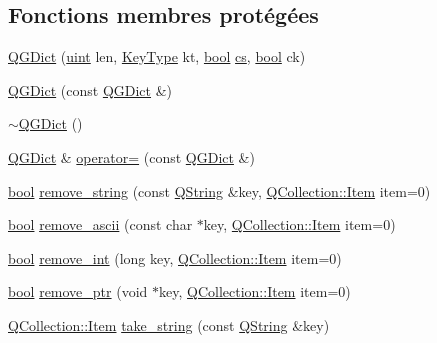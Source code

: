 \subsection*{Fonctions membres protégées}
\begin{DoxyCompactItemize}
\item 
\hyperlink{class_q_g_dict_a9dd35b06699b4527dd7e66d1b962b475}{Q\+G\+Dict} (\hyperlink{qglobal_8h_a4d3943ddea65db7163a58e6c7e8df95a}{uint} len, \hyperlink{class_q_g_dict_a4eced3c3c4e5c52360bc2f1bab85412e}{Key\+Type} kt, \hyperlink{qglobal_8h_a1062901a7428fdd9c7f180f5e01ea056}{bool} \hyperlink{qtextcodec_8cpp_a067a00d3965ca879847daf3c8c224ee6}{cs}, \hyperlink{qglobal_8h_a1062901a7428fdd9c7f180f5e01ea056}{bool} ck)
\item 
\hyperlink{class_q_g_dict_a137d355f22abdcbda8ded8b8736ec117}{Q\+G\+Dict} (const \hyperlink{class_q_g_dict}{Q\+G\+Dict} \&)
\item 
\hyperlink{class_q_g_dict_a51b6a3f2e12ac41c0a29ce248bb1ac96}{$\sim$\+Q\+G\+Dict} ()
\item 
\hyperlink{class_q_g_dict}{Q\+G\+Dict} \& \hyperlink{class_q_g_dict_a8c4e70b0dee22ada9bf8a41e3c92280d}{operator=} (const \hyperlink{class_q_g_dict}{Q\+G\+Dict} \&)
\item 
\hyperlink{qglobal_8h_a1062901a7428fdd9c7f180f5e01ea056}{bool} \hyperlink{class_q_g_dict_a50cd12c84c03da6cd92d413908d1a001}{remove\+\_\+string} (const \hyperlink{class_q_string}{Q\+String} \&key, \hyperlink{class_q_collection_ac6f3ddbf999e31fb797927f71ae6b5d7}{Q\+Collection\+::\+Item} item=0)
\item 
\hyperlink{qglobal_8h_a1062901a7428fdd9c7f180f5e01ea056}{bool} \hyperlink{class_q_g_dict_a65224d18f945fa28a1300526fd4b5903}{remove\+\_\+ascii} (const char $\ast$key, \hyperlink{class_q_collection_ac6f3ddbf999e31fb797927f71ae6b5d7}{Q\+Collection\+::\+Item} item=0)
\item 
\hyperlink{qglobal_8h_a1062901a7428fdd9c7f180f5e01ea056}{bool} \hyperlink{class_q_g_dict_a32023e3d50d6f8b81935655b66f0bdc4}{remove\+\_\+int} (long key, \hyperlink{class_q_collection_ac6f3ddbf999e31fb797927f71ae6b5d7}{Q\+Collection\+::\+Item} item=0)
\item 
\hyperlink{qglobal_8h_a1062901a7428fdd9c7f180f5e01ea056}{bool} \hyperlink{class_q_g_dict_abc3fd70fe1c1f6523e3ce4258672a4ca}{remove\+\_\+ptr} (void $\ast$key, \hyperlink{class_q_collection_ac6f3ddbf999e31fb797927f71ae6b5d7}{Q\+Collection\+::\+Item} item=0)
\item 
\hyperlink{class_q_collection_ac6f3ddbf999e31fb797927f71ae6b5d7}{Q\+Collection\+::\+Item} \hyperlink{class_q_g_dict_a17b54499d2315700966df4ad58381b79}{take\+\_\+string} (const \hyperlink{class_q_string}{Q\+String} \&key)

\end{DoxyCompactItemize}
